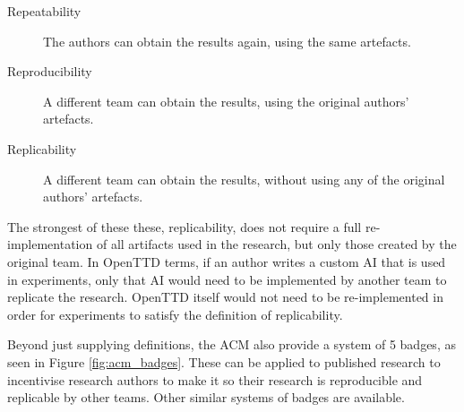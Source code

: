 \documentclass[logo,msc]{infthesis}           %
\begin{document}
\begin{description}
\item[Repeatability] The authors can obtain the results again, using the same artefacts.
\item[Reproducibility] A different team can obtain the results, using the original authors' artefacts.
\item[Replicability] A different team can obtain the results, without using any of the original authors' artefacts.
\end{description}

The strongest of these these, replicability, does not require a full re-implementation of all artifacts used in the research, but only those created by the original team. In OpenTTD terms, if an author writes a custom AI that is used in experiments, only that AI would need to be implemented by another team to replicate the research. OpenTTD itself would not need to be re-implemented in order for experiments to satisfy the definition of replicability.

Beyond just supplying definitions, the ACM also provide a system of 5 badges, as seen in Figure \ref{fig:acm_badges}. These can be applied to published research to incentivise research authors to make it so their research is reproducible and replicable by other teams. Other similar systems of badges are available.
\end{document}
